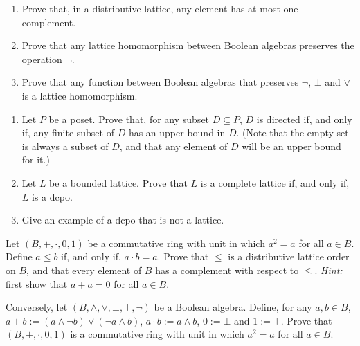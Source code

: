 \begin{exercise}\label{exe:distuncomp}
\begin{enumerate}
\item Prove that, in a distributive lattice, any element has at most one complement.
\item\label{itm:lathomBA} Prove that any lattice homomorphism between Boolean algebras preserves the operation $\neg$.
\item Prove that any function between Boolean algebras that preserves $\neg$, $\bot$ and $\vee$ is a lattice homomorphism.
\end{enumerate}
\end{exercise}

\begin{exercise}\label{exe:directed}
\begin{enumerate}
\item   Let $P$ be a poset. Prove that, for any subset $D \subseteq P$, $D$ is directed if, and only if, any finite subset of $D$ has an upper bound in $D$. (Note that the empty set is always a subset of $D$, and that any element of $D$ will be an upper bound for it.)
\item Let $L$ be a bounded lattice. Prove that $L$ is a complete lattice if, and only if, $L$ is a dcpo.
\item Give an example of a dcpo that is not a lattice.
\end{enumerate}
\end{exercise}

\begin{exercise}\label{exe:BAeq}
Let $(B,+,\cdot,0,1)$ be a commutative ring with unit in which $a^2 = a$ for all $a \in B$. Define $a \leq b$ if, and only if, $a \cdot b = a$. Prove that $\leq$ is a distributive lattice order on $B$, and that
 every element of $B$ has a complement with respect to $\leq$. \emph{Hint:} first show that $a + a = 0$ for all $a \in B$.

Conversely, let $(B,\wedge,\vee,\bot,\top,\neg)$ be a Boolean algebra. Define, for any $a, b \in B$, $a + b := (a \wedge \neg b) \vee (\neg a \wedge b)$, $a \cdot b := a \wedge b$, $0 := \bot$ and $1 := \top$. Prove that $(B,+,\cdot,0,1)$ is a commutative ring with unit in which $a^2 = a$ for all $a \in B$.
\end{exercise}


